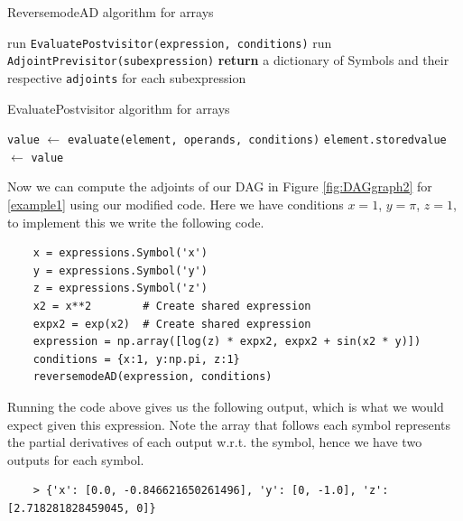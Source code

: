 \documentclass{article}
\begin{document}
\begin{algorithm}[h]
\caption{ReversemodeAD algorithm for arrays}\label{reverseADArr}
\begin{algorithmic}[1]
\State run \verb|EvaluatePostvisitor(expression, conditions)|
\State run \verb|AdjointPrevisitor(subexpression)|
\EndFor
\State \textbf{return} a dictionary of Symbols and their respective \verb|adjoints| for each subexpression
\EndProcedure
\end{algorithmic}
\end{algorithm}

\begin{algorithm}[h!]
\caption{EvaluatePostvisitor algorithm for arrays}\label{EvaluatePostvisitorArr}
\begin{algorithmic}[1]
\State \verb|value| $\gets$ \verb|evaluate(element, operands, conditions)|
\State \verb|element.storedvalue| $\gets$ \verb|value|
\EndFor
\EndFor
\EndProcedure
\end{algorithmic}
\end{algorithm}

Now we can compute the adjoints of our DAG in Figure \ref{fig:DAGgraph2} for \eqref{example1} using our modified code. Here we have conditions $x=1$, $y=\pi$, $z=1$, to implement this we write the following code.

\begin{verbatim}
    x = expressions.Symbol('x')
    y = expressions.Symbol('y')
    z = expressions.Symbol('z')
    x2 = x**2        # Create shared expression
    expx2 = exp(x2)  # Create shared expression
    expression = np.array([log(z) * expx2, expx2 + sin(x2 * y)])
    conditions = {x:1, y:np.pi, z:1}
    reversemodeAD(expression, conditions)
\end{verbatim}

Running the code above gives us the following output, which is what we would expect given this expression. Note the array that follows each symbol represents the partial derivatives of each output w.r.t. the symbol, hence we have two outputs for each symbol.
\begin{verbatim}
    > {'x': [0.0, -0.846621650261496], 'y': [0, -1.0], 'z': [2.718281828459045, 0]}
\end{verbatim}
\end{document}
